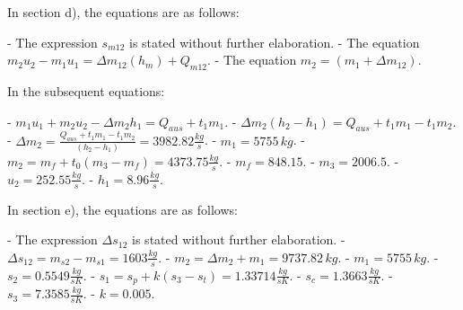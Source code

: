 In section d), the equations are as follows:

- The expression \( s_{m12} \) is stated without further elaboration.
- The equation \( m_2 u_2 - m_1 u_1 = \Delta m_{12} (h_m) + Q_{m12} \).
- The equation \( m_2 = (m_1 + \Delta m_{12}) \).

In the subsequent equations:

- \( m_1 u_1 + m_2 u_2 - \Delta m_2 h_1 = Q_{aus} + t_1 m_1 \).
- \( \Delta m_2 (h_2 - h_1) = Q_{aus} + t_1 m_1 - t_1 m_2 \).
- \( \Delta m_2 = \frac{Q_{aus} + t_1 m_1 - t_1 m_2}{(h_2 - h_1)} = 3982.82 \frac{kg}{s} \).
- \( m_1 = 5755 \, kg \).
- \( m_2 = m_f + t_0 (m_3 - m_f) = 4373.75 \frac{kg}{s} \).
- \( m_f = 848.15 \).
- \( m_3 = 2006.5 \).
- \( u_2 = 252.55 \frac{kg}{s} \).
- \( h_1 = 8.96 \frac{kg}{s} \).

In section e), the equations are as follows:

- The expression \( \Delta s_{12} \) is stated without further elaboration.
- \( \Delta s_{12} = m_{s2} - m_{s1} = 1603 \frac{kg}{s} \).
- \( m_2 = \Delta m_2 + m_1 = 9737.82 \, kg \).
- \( m_1 = 5755 \, kg \).
- \( s_2 = 0.5549 \frac{kg}{sK} \).
- \( s_1 = s_p + k(s_3 - s_t) = 1.33714 \frac{kg}{sK} \).
- \( s_c = 1.3663 \frac{kg}{sK} \).
- \( s_3 = 7.3585 \frac{kg}{sK} \).
- \( k = 0.005 \).